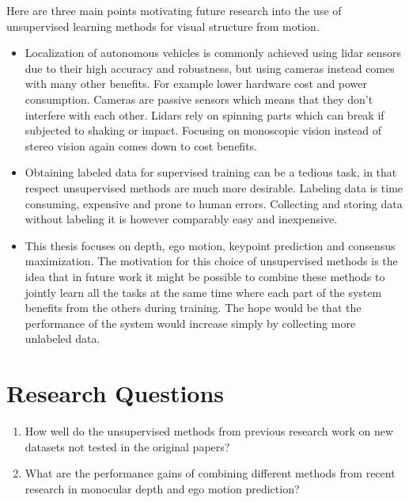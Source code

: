 Here are three main points motivating future research into the use of unsupervised learning methods for visual structure from motion.


\begin{itemize}
	\item Localization of autonomous vehicles is commonly  achieved using lidar sensors due to their high accuracy and robustness, but using cameras instead comes with many other benefits. For example lower hardware cost and power consumption. Cameras are passive sensors which means that they don't interfere with each other. Lidars rely on spinning parts which can break if subjected to shaking or impact. Focusing on monoscopic vision instead of stereo vision again comes down to cost benefits.
	
	\item Obtaining labeled data for supervised training can be a tedious task, in that respect unsupervised methods are much more desirable. Labeling data is time consuming, expensive and prone to human errors. Collecting and storing data without labeling it is however comparably easy and inexpensive.
	
	\item This thesis focuses on depth, ego motion, keypoint prediction and consensus maximization. The motivation for this choice of unsupervised methods is the idea that in future work it might be possible to combine these methods to jointly learn all the tasks at the same time where each part of the system benefits from the others during training. The hope would be that the performance of the system would increase simply by collecting more unlabeled data.
\end{itemize}

\section{Research Questions}

\begin{enumerate}
	
	\item How well do the unsupervised methods from previous research work on new datasets not tested in the original papers?
	
	\item What are the performance gains of combining different methods from recent research in monocular depth and ego motion prediction?
	
\end{enumerate}

